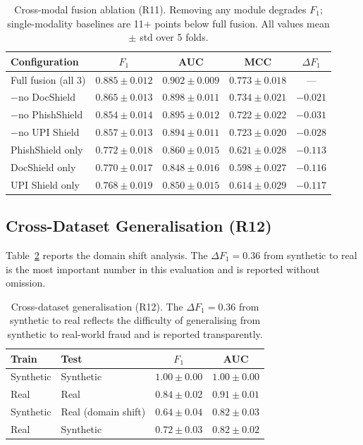 \documentclass[conference]{IEEEtran}
\begin{document}
\begin{table}[t]
\caption{Cross-modal fusion ablation (R11). Removing any module degrades
$F_1$; single-modality baselines are 11$+$ points below full fusion.
All values mean $\pm$ std over 5 folds.}
\label{tab:ablation}
\centering
\small
\begin{tabular}{lcccc}
\toprule
\textbf{Configuration} & \textbf{$F_1$} & \textbf{AUC}
  & \textbf{MCC} & \textbf{$\Delta F_1$} \\
\midrule
Full fusion (all 3)  & $0.885{\pm}0.012$ & $0.902{\pm}0.009$ & $0.773{\pm}0.018$ & --- \\
$-$no DocShield      & $0.865{\pm}0.013$ & $0.898{\pm}0.011$ & $0.734{\pm}0.021$ & $-0.021$ \\
$-$no PhishShield    & $0.854{\pm}0.014$ & $0.895{\pm}0.012$ & $0.722{\pm}0.022$ & $-0.031$ \\
$-$no UPI Shield     & $0.857{\pm}0.013$ & $0.894{\pm}0.011$ & $0.723{\pm}0.020$ & $-0.028$ \\
PhishShield only     & $0.772{\pm}0.018$ & $0.860{\pm}0.015$ & $0.621{\pm}0.028$ & $-0.113$ \\
DocShield only       & $0.770{\pm}0.017$ & $0.848{\pm}0.016$ & $0.598{\pm}0.027$ & $-0.116$ \\
UPI Shield only      & $0.768{\pm}0.019$ & $0.850{\pm}0.015$ & $0.614{\pm}0.029$ & $-0.117$ \\
\bottomrule
\end{tabular}
\end{table}

\subsection{Cross-Dataset Generalisation (R12)}
Table~\ref{tab:generalization} reports the domain shift analysis.
The $\Delta F_1{=}0.36$ from synthetic to real is the most important
number in this evaluation and is reported without omission.

\begin{table}[t]
\caption{Cross-dataset generalisation (R12). The $\Delta F_1{=}0.36$
from synthetic to real reflects the difficulty of generalising from
synthetic to real-world fraud and is reported transparently.}
\label{tab:generalization}
\centering
\small
\begin{tabular}{llcc}
\toprule
\textbf{Train} & \textbf{Test} & \textbf{$F_1$} & \textbf{AUC} \\
\midrule
Synthetic & Synthetic            & $1.00{\pm}0.00$ & $1.00{\pm}0.00$ \\
Real      & Real                 & $0.84{\pm}0.02$ & $0.91{\pm}0.01$ \\
Synthetic & Real (domain shift)  & $0.64{\pm}0.04$ & $0.82{\pm}0.03$ \\
Real      & Synthetic            & $0.72{\pm}0.03$ & $0.82{\pm}0.02$ \\
\bottomrule
\end{tabular}
\end{table}
\end{document}
